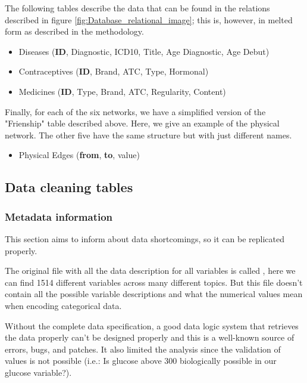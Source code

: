 The following tables describe the data that can be found in the relations described in figure \ref{fig:Database_relational_image}; this is, however, in melted form as described in the methodology.

\begin{itemize}

    \item {Diseases} (\textbf{ID}, Diagnostic, ICD10, Title, Age Diagnostic, Age Debut)     
    
    \item {Contraceptives} (\textbf{ID}, Brand, ATC, Type, Hormonal) 
    
    \item {Medicines} (\textbf{ID}, Type, Brand, ATC, Regularity, Content)        
\end{itemize}

Finally, for each of the six networks, we have a simplified version of the "Frienship" table described above. Here, we give an example of the physical network. The other five have the same structure but with just different names.

\begin{itemize}
    \item {Physical Edges} (\textbf{from}, \textbf{to}, value)     
\end{itemize}

\subsection{Data cleaning tables}

\subsubsection{Metadata information}

This section aims to inform about data shortcomings, so it can be replicated properly.

The original file with all the data description for all variables is called , here we can find 1514 different variables across many different topics. But this file doesn't contain all the possible variable descriptions and what the numerical values mean when encoding categorical data.

Without the complete data specification, a good data logic system that retrieves the data properly can't be designed properly and this is a well-known source of errors, bugs, and patches. It also limited the analysis since the validation of values is not possible (i.e.: Is glucose above 300 biologically possible in our glucose variable?).

